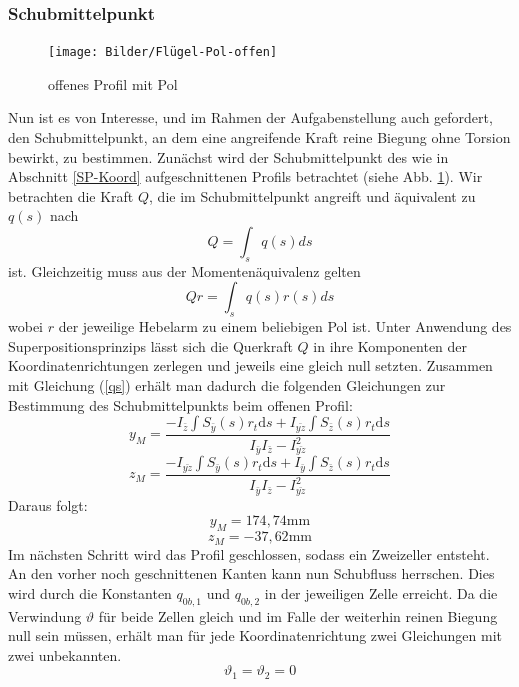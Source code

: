 \subsubsection{Schubmittelpunkt}
\begin{figure}[h]
	\centering
	\texttt{[image: Bilder/Flügel-Pol-offen]}
	\caption{offenes Profil mit Pol}
	\label{Fluegel2}
\end{figure}
Nun ist es von Interesse, und im Rahmen der Aufgabenstellung auch gefordert, den Schubmittelpunkt, an dem eine angreifende Kraft reine Biegung ohne Torsion bewirkt, zu bestimmen.
Zunächst wird der Schubmittelpunkt des wie in Abschnitt \ref{SP-Koord} aufgeschnittenen Profils betrachtet (siehe Abb. \ref{Fluegel2}). Wir betrachten die Kraft $Q$, die im Schubmittelpunkt angreift und äquivalent zu $q(s)$ nach
\begin{equation}
	Q=\int_{s}^{}q(s)ds
\end{equation}
ist. Gleichzeitig muss aus der Momentenäquivalenz gelten
\begin{equation}
	Qr=\int_{s}q(s)r(s)ds
\end{equation}
wobei $r$ der jeweilige Hebelarm zu einem beliebigen Pol ist. Unter Anwendung des Superpositionsprinzips lässt sich die Querkraft $Q$ in ihre Komponenten der Koordinatenrichtungen zerlegen und jeweils eine gleich null setzten. Zusammen mit Gleichung (\ref{qs}) erhält man dadurch die folgenden Gleichungen zur Bestimmung des Schubmittelpunkts beim offenen Profil:
\begin{equation}
	y_{M}=\frac{-I_{\bar{z}}\int S_{\bar{y}}(s) r_{t}\mathrm{d}s+I_{\bar{yz}}\int S_{\bar{z}}(s) r_{t}\mathrm{d}s}{I_{\bar{y}}I_{\bar{z}}-I_{\bar{yz}}^2}
\end{equation}
\begin{equation}
	z_{M}=\frac{-I_{\bar{yz}}\int S_{\bar{y}}(s) r_{t}\mathrm{d}s+I_{\bar{y}}\int S_{\bar{z}}(s) r_{t}\mathrm{d}s}{I_{\bar{y}}I_{\bar{z}}-I_{\bar{yz}}^2}
\end{equation}
Daraus folgt:
$$
	y_{M}=174,74\mathrm{mm}
$$
$$
	z_{M}=-37,62\mathrm{mm}
$$
Im nächsten Schritt wird das Profil geschlossen, sodass ein Zweizeller entsteht. An den vorher noch geschnittenen Kanten kann nun Schubfluss herrschen. Dies wird durch die Konstanten $q_{0b,1}$ und $q_{0b,2}$ in der jeweiligen Zelle erreicht.
Da die Verwindung $\vartheta$ für beide Zellen gleich und im Falle der weiterhin reinen Biegung null sein müssen, erhält man für jede Koordinatenrichtung zwei Gleichungen mit zwei unbekannten.
\begin{equation}
	\vartheta_{1}=\vartheta_{2}=0
\end{equation}
